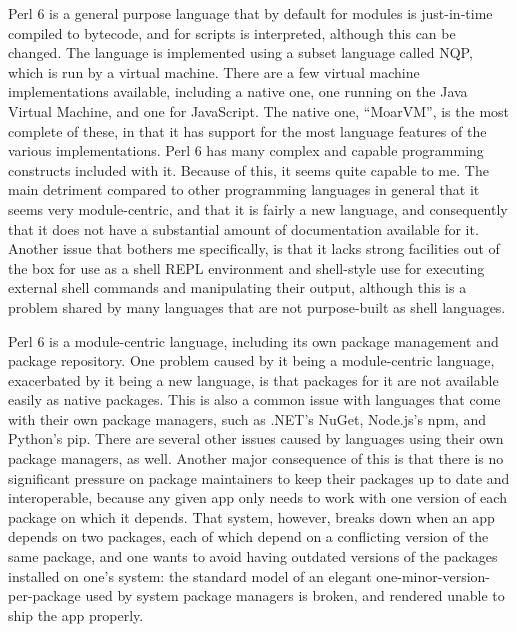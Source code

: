 \documentclass[14pt,english]{extarticle}
\begin{document}
Perl 6 is a general purpose language that by default for modules is
just-in-time compiled to bytecode, and for scripts is interpreted,
although this can be changed. The language is implemented using a
subset language called NQP, which is run by a virtual machine. There
are a few virtual machine implementations available, including a native
one, one running on the Java Virtual Machine, and one for JavaScript.
The native one, ``MoarVM'', is the most complete of these, in that
it has support for the most language features of the various implementations.
\cite{project} Perl 6 has many complex and capable programming constructs
included with it. Because of this, it seems quite capable to me. The
main detriment compared to other programming languages in general
that it seems very module-centric, and that it is fairly a new language,
and consequently that it does not have a substantial amount of documentation
available for it. Another issue that bothers me specifically, is that
it lacks strong facilities out of the box for use as a shell REPL
environment and shell-style use for executing external shell commands
and manipulating their output, although this is a problem shared by
many languages that are not purpose-built as shell languages.

Perl 6 is a module-centric language, including its own package management
and package repository. One problem caused by it being a module-centric
language, exacerbated by it being a new language, is that packages
for it are not available easily as native packages. This is also a
common issue with languages that come with their own package managers,
such as .NET's NuGet, Node.js's npm, and Python's pip. There are several
other issues caused by languages using their own package managers,
as well. Another major consequence of this is that there is no significant
pressure on package maintainers to keep their packages up to date
and interoperable, because any given app only needs to work with one
version of each package on which it depends. That system, however,
breaks down when an app depends on two packages, each of which depend
on a conflicting version of the same package, and one wants to avoid
having outdated versions of the packages installed on one's system:
the standard model of an elegant one-minor-version-per-package used
by system package managers is broken, and rendered unable to ship
the app properly.
\end{document}
